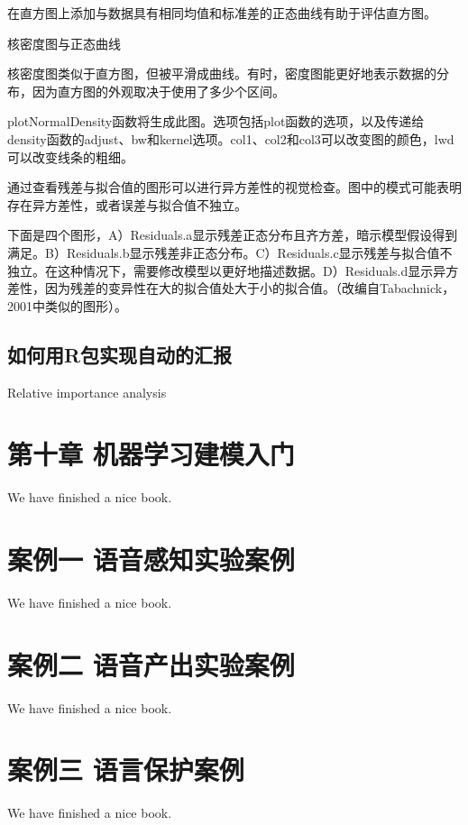 \documentclass[]{book}
\begin{document}
在直方图上添加与数据具有相同均值和标准差的正态曲线有助于评估直方图。

核密度图与正态曲线

核密度图类似于直方图，但被平滑成曲线。有时，密度图能更好地表示数据的分布，因为直方图的外观取决于使用了多少个区间。

plotNormalDensity函数将生成此图。选项包括plot函数的选项，以及传递给density函数的adjust、bw和kernel选项。col1、col2和col3可以改变图的颜色，lwd可以改变线条的粗细。

通过查看残差与拟合值的图形可以进行异方差性的视觉检查。图中的模式可能表明存在异方差性，或者误差与拟合值不独立。

下面是四个图形，A）Residuals.a显示残差正态分布且齐方差，暗示模型假设得到满足。B）Residuals.b显示残差非正态分布。C）Residuals.c显示残差与拟合值不独立。在这种情况下，需要修改模型以更好地描述数据。D）Residuals.d显示异方差性，因为残差的变异性在大的拟合值处大于小的拟合值。（改编自Tabachnick，2001中类似的图形）。

\hypertarget{ux5982ux4f55ux7528rux5305ux5b9eux73b0ux81eaux52a8ux7684ux6c47ux62a5}{%
\section{如何用R包实现自动的汇报}\label{ux5982ux4f55ux7528rux5305ux5b9eux73b0ux81eaux52a8ux7684ux6c47ux62a5}}

Relative importance analysis

\hypertarget{ux7b2cux5341ux7ae0-ux673aux5668ux5b66ux4e60ux5efaux6a21ux5165ux95e8}{%
\chapter{第十章 机器学习建模入门}\label{ux7b2cux5341ux7ae0-ux673aux5668ux5b66ux4e60ux5efaux6a21ux5165ux95e8}}

We have finished a nice book.

\hypertarget{ux6848ux4f8bux4e00-ux8bedux97f3ux611fux77e5ux5b9eux9a8cux6848ux4f8b}{%
\chapter{案例一 语音感知实验案例}\label{ux6848ux4f8bux4e00-ux8bedux97f3ux611fux77e5ux5b9eux9a8cux6848ux4f8b}}

We have finished a nice book.

\hypertarget{ux6848ux4f8bux4e8c-ux8bedux97f3ux4ea7ux51faux5b9eux9a8cux6848ux4f8b}{%
\chapter{案例二 语音产出实验案例}\label{ux6848ux4f8bux4e8c-ux8bedux97f3ux4ea7ux51faux5b9eux9a8cux6848ux4f8b}}

We have finished a nice book.

\hypertarget{ux6848ux4f8bux4e09-ux8bedux8a00ux4fddux62a4ux6848ux4f8b}{%
\chapter{案例三 语言保护案例}\label{ux6848ux4f8bux4e09-ux8bedux8a00ux4fddux62a4ux6848ux4f8b}}

We have finished a nice book.


\end{document}
